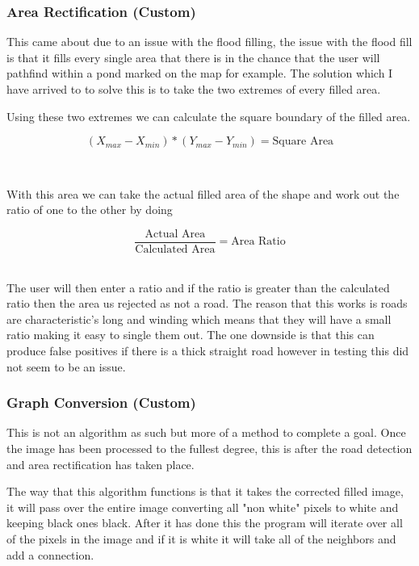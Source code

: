 \begin{FlushLeft}
    \subsubsection{Area Rectification (Custom)}
    This came about due to an issue with the flood filling, the issue with the flood fill is that it fills every single area that there is in the chance that the user will pathfind within a pond marked on the map for example. The solution which I have arrived to to solve this is to take the two extremes of every filled area. \\ \bk

    Using these two extremes we can calculate the square boundary of the filled area.

    $$
        (X_{max} - X_{min}) * (Y_{max} - Y_{min}) = \text{Square Area} 
    $$

    \\ \bk

    With this area we can take the actual filled area of the shape and work out the ratio of one to the other by doing

    $$
        \frac{\text{Actual Area}}{\text{Calculated Area}} = \text{Area Ratio}
    $$
    \\ \bk

    The user will then enter a ratio and if the ratio is greater than the calculated ratio then the area us rejected as not a road. The reason that this works is roads are characteristic's long and winding which means that they will have a small ratio making it easy to single them out. The one downside is that this can produce false positives if there is a thick straight road however in testing this did not seem to be an issue. \\


    \bk

    \subsubsection{Graph Conversion (Custom)}
    This is not an algorithm as such but more of a method to complete a goal. Once the image has been processed to the fullest degree, this is after the road detection and area rectification has taken place.  \\ \bk

    The way that this algorithm functions is that it takes the corrected filled image, it will pass over the entire image converting all "non white" pixels to white and keeping black ones black. After it has done this the program will iterate over all of the pixels in the image and if it is white it will take all of the neighbors and add a connection. \\ \bk


\end{FlushLeft}
